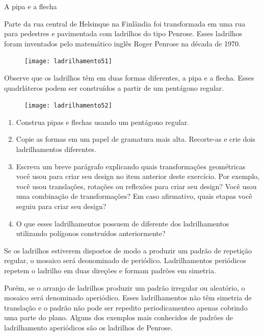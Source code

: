 \begin{task}{A pipa e a flecha}

Parte da rua central de Helsinque na Finlândia foi transformada em uma rua para pedestres e pavimentada com ladrilhos do tipo Penrose. Esses ladrilhos foram inventados pelo matemático inglês Roger Penrose na década de 1970.

\begin{figure}[H]
	\centering
	\texttt{[image: ladrilhamento51]}

\end{figure}

Observe que os ladrilhos têm em duas formas diferentes, a pipa e a flecha. Esses quadrláteros podem ser construídos a partir de um pentágono regular.

	\begin{figure}[H]
	\centering
	\texttt{[image: ladrilhamento52]}

	\end{figure}
	\begin{enumerate}
		\item Construa pipas e flechas usando um pentágono regular.
		\item Copie as formas em um papel de gramatura mais alta. Recorte-as e crie dois ladrilhamentos diferentes.
		\item Escreva um breve parágrafo explicando quais transformações geométricas você usou para criar seu design no item anterior deste exercício. Por exemplo, você usou translações, rotações ou reflexões para criar seu design? Você usou uma combinação de transformações? Em caso afirmativo, quais etapas você seguiu para criar seu design?
		\item O que esses ladrilhamentos possuem de diferente dos ladrilhamentos utilizando polígonos construídos anteriormente?
	\end{enumerate}
\end{task}

	\begin{knowledge}
	Se os ladrilhos estiverem dispostos de modo a produzir um padrão de repetição regular, o mosaico será deonominado de periódico. Ladrilhamentos periódicos repetem o ladrilho em duas direções e formam padrões em simetria.

	Porém, se o arranjo de ladrilhos produzir um padrão irregular ou aleatório, o mosaico será denominado aperiódico. Esses ladrilhamentos não têm simetria de translação e o padrão não pode ser repedito periodicamenteo apenas cobrindo uma parte do plano. Alguns dos exemplos mais conhecidos de padrões de ladrilhamento aperiódicos são os ladrilhos de Penrose.
	\end{knowledge}


